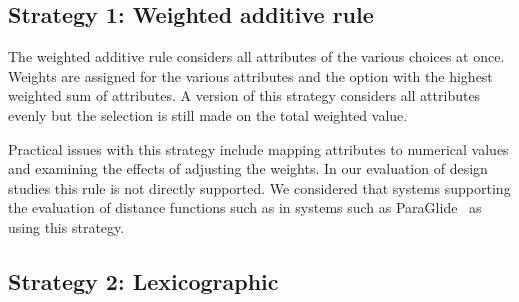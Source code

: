 
\subsection{Strategy 1: Weighted additive rule}\label{weighted-additive-rule}

The weighted additive rule considers all
attributes of the various choices at once.
Weights are assigned for the various attributes and 
the option with the highest weighted sum of attributes.
A version of this strategy considers all attributes evenly but 
the selection is still made on the total weighted value.

Practical issues with this strategy include mapping attributes to numerical values
and examining the effects of adjusting the weights. In our evaluation of
design studies this rule is not directly supported. We considered that
systems supporting the evaluation of distance functions such as 
in systems such as ParaGlide~\citep{Bergner:2013} as using this strategy.

\begin{table}[tb]
    \caption{Classification of the 21 papers listed in 
             Sedlmair et al.~\citep{Sedlmair:2014} according to which decision making
             strategies.  %
    }
    \label{tbl:decision-types}
\end{table}

\subsection{Strategy 2: Lexicographic}\label{lexicographic}

